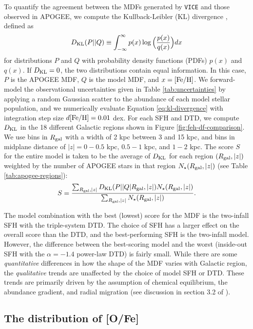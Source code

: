 \documentclass[twocolumn,twocolappendix]{aastex631}
\newcommand{\vice}{{\tt VICE}\xspace}
\begin{document}
To quantify the agreement between the MDFs generated by \vice and those observed in APOGEE, we compute the Kullback-Leibler (KL) divergence \citep{KullbackLeibler1951}, defined as
\begin{equation}
    D_{\rm{KL}}(P||Q) \equiv \int_{-\infty}^{\infty} p(x) \log\Big(\frac{p(x)}{q(x)}\Big) dx
    \label{eq:kl-divergence}
\end{equation}
for distributions $P$ and $Q$ with probability density functions (PDFs) $p(x)$ and $q(x)$. If $D_{\rm KL}=0$, the two distributions contain equal information. In this case, $P$ is the APOGEE MDF, $Q$ is the model MDF, and $x={\rm [Fe/H]}$. We forward-model the observational uncertainties given in Table \ref{tab:uncertainties} by applying a random Gaussian scatter to the abundance of each model stellar population, and we numerically evaluate Equation \ref{eq:kl-divergence} with integration step size $d{\rm [Fe/H]}=0.01$ dex.
For each SFH and DTD, we compute $D_{\rm{KL}}$ in the 18 different Galactic regions shown in Figure \ref{fig:feh-df-comparison}. We use bins in $R_{\rm gal}$ with a width of 2 kpc between 3 and 15 kpc, and bins in midplane distance of $|z|=0-0.5$ kpc, $0.5-1$ kpc, and $1-2$ kpc. The score $S$ for the entire model is taken to be the average of $D_{\rm{KL}}$ for each region $(R_{\rm gal}, |z|)$ weighted by the number of APOGEE stars in that region $N_\star(R_{\rm gal}, |z|)$ (see Table \ref{tab:apogee-regions}):
\begin{equation}
    S = \frac{\sum_{R_{\rm gal}, |z|} D_{\rm KL}(P||Q|R_{\rm gal}, |z|) N_\star(R_{\rm gal}, |z|)}{\sum_{R_{\rm gal}, |z|} N_\star(R_{\rm gal}, |z|)}.
    \label{eq:feh-df-score}
\end{equation}

The model combination with the best (lowest) score for the MDF is the two-infall SFH with the triple-system DTD. The choice of SFH has a larger effect on the overall score than the DTD, and the best-performing SFH is the two-infall model. However, the difference between the best-scoring model and the worst (inside-out SFH with the $\alpha=-1.4$ power-law DTD) is fairly small. While there are some {\it quantitative} differences in how the shape of the MDF varies with Galactic region, the {\it qualitative} trends are unaffected by the choice of model SFH or DTD. These trends are primarily driven by the assumption of chemical equilibrium, the abundance gradient, and radial migration (see discussion in section 3.2 of ).

\subsection{The distribution of [O/Fe]}
\label{sec:ofe-df}
\end{document}
